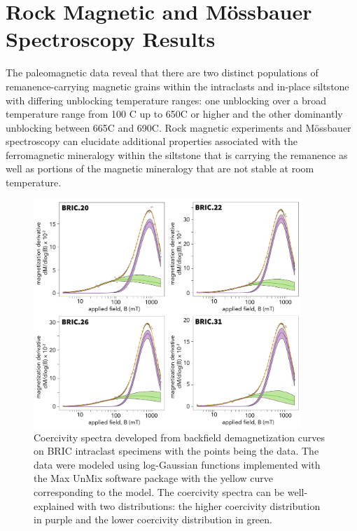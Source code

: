 \documentclass[draft]{agujournal2018}
\begin{document}
\section*{Rock Magnetic and M{\"o}ssbauer Spectroscopy Results}

The paleomagnetic data reveal that there are two distinct populations of remanence-carrying magnetic grains within the intraclasts and in-place siltstone with differing unblocking temperature ranges: one unblocking over a broad temperature range from 100 \textdegree C up to 650\textdegree C or higher and the other dominantly unblocking between 665\textdegree C and 690\textdegree C. Rock magnetic experiments and M{\"o}ssbauer spectroscopy can elucidate additional properties associated with the ferromagnetic mineralogy within the siltstone that is carrying the remanence as well as portions of the magnetic mineralogy that are not stable at room temperature.

\begin{figure}[!ht]
\noindent\includegraphics[width=0.9\textwidth]{figures/coercivity_spectra.pdf}
\caption{\small{Coercivity spectra developed from backfield demagnetization curves on BRIC intraclast specimens with the points being the data. The data were modeled using log-Gaussian functions implemented with the Max UnMix software package \citep{Maxbauer2016a} with the yellow curve corresponding to the model. The coercivity spectra can be well-explained with two distributions: the higher coercivity distribution in purple and the lower coercivity distribution in green.}}
\label{fig:coercivity_spectra}
\end{figure}
\end{document}
